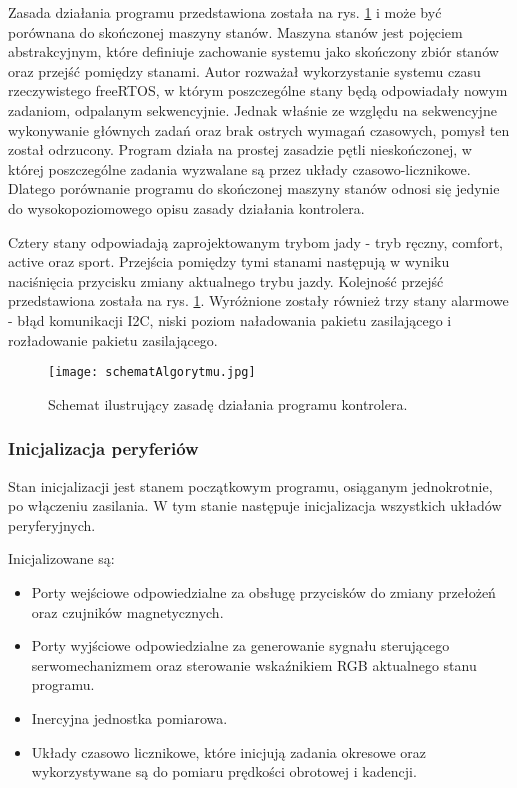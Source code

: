 Zasada działania programu przedstawiona została na rys. \ref{fig:schematAlgorytmu} i może być porównana do skończonej maszyny stanów. Maszyna stanów jest pojęciem abstrakcyjnym, które definiuje zachowanie systemu jako skończony zbiór stanów oraz przejść pomiędzy stanami. Autor rozważał wykorzystanie systemu czasu rzeczywistego freeRTOS, w którym poszczególne stany będą odpowiadały nowym zadaniom, odpalanym sekwencyjnie. Jednak właśnie ze względu na sekwencyjne wykonywanie głównych zadań oraz brak ostrych wymagań czasowych, pomysł ten został odrzucony. Program działa na prostej zasadzie pętli nieskończonej, w której poszczególne zadania wyzwalane są przez układy czasowo-licznikowe. Dlatego porównanie programu do skończonej maszyny stanów odnosi się jedynie do wysokopoziomowego opisu zasady działania kontrolera. 

Cztery stany odpowiadają zaprojektowanym trybom jady - tryb ręczny, comfort, active oraz sport. Przejścia pomiędzy tymi stanami następują w wyniku naciśnięcia przycisku zmiany aktualnego trybu jazdy. Kolejność przejść przedstawiona została na rys. \ref{fig:schematAlgorytmu}. Wyróżnione zostały również trzy stany alarmowe - błąd komunikacji I2C, niski poziom naładowania pakietu zasilającego i rozładowanie pakietu zasilającego. 
\begin{figure}[h]
    \centering
    \texttt{[image: schematAlgorytmu.jpg]}
    \caption{Schemat ilustrujący zasadę działania programu kontrolera.}
    \label{fig:schematAlgorytmu}
\end{figure}
\subsubsection{Inicjalizacja peryferiów}
Stan inicjalizacji jest stanem początkowym programu, osiąganym jednokrotnie, po włączeniu zasilania. W tym stanie następuje inicjalizacja wszystkich układów peryferyjnych. 

Inicjalizowane są:
\begin{itemize}
\item
Porty wejściowe odpowiedzialne za obsługę przycisków do zmiany przełożeń oraz czujników magnetycznych.
\item
Porty wyjściowe odpowiedzialne za generowanie sygnału sterującego serwomechanizmem oraz sterowanie wskaźnikiem RGB aktualnego stanu programu. 
\item
Inercyjna jednostka pomiarowa.
\item
Układy czasowo licznikowe, które inicjują zadania okresowe oraz wykorzystywane są do pomiaru prędkości obrotowej i kadencji.
\end{itemize}

